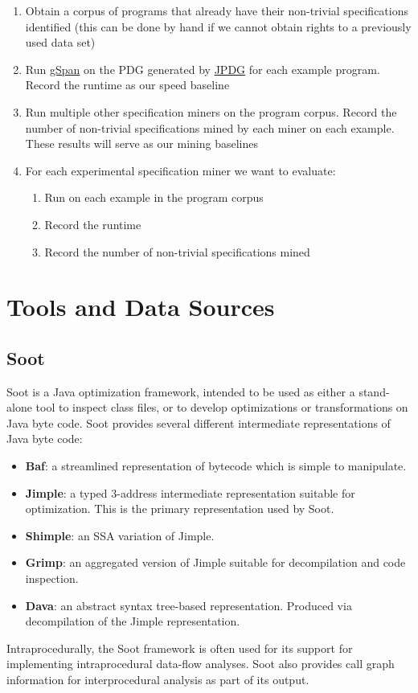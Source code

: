\documentclass[12pt]{article}
\begin{document}
\begin{enumerate}
    \item Obtain a corpus of programs that already have their non-trivial specifications identified (this can be done by hand if we cannot obtain rights to a previously used data set)
    \item Run \hyperref[subsection:gSpan]{gSpan} on the PDG generated by \hyperref[subsection:JPDG]{JPDG} for each example program. Record the runtime as our speed baseline
    \item Run multiple other specification miners on the program corpus. Record the number of non-trivial specifications mined by each miner on each example. These results will serve as our mining baselines
    \item For each experimental specification miner we want to evaluate:
    \begin{enumerate}
        \item Run on each example in the program corpus
        \item Record the runtime
        \item Record the number of non-trivial specifications mined
    \end{enumerate}
\end{enumerate}

\section{Tools and Data Sources}
\label{section:Tools and Data Sources}
\subsection{Soot}
Soot is a Java optimization framework, intended to be used as either a stand-alone tool to inspect class files, or to develop optimizations or transformations on Java byte code. Soot provides several different intermediate representations of Java byte code: \cite{lam11:_soot_java}
\begin{itemize}
    \item\textbf{Baf}: a streamlined representation of bytecode which is simple to manipulate.
    \item\textbf{Jimple}: a typed 3-address intermediate representation suitable for optimization. This is the primary representation used by Soot.
    \item\textbf{Shimple}: an SSA variation of Jimple.
    \item\textbf{Grimp}: an aggregated version of Jimple suitable for decompilation and code inspection.
    \item\textbf{Dava}: an abstract syntax tree-based representation. Produced via decompilation of the Jimple representation.
\end{itemize}
Intraprocedurally, the Soot framework is often used for its support for implementing intraprocedural data-flow analyses. Soot also provides call graph information for interprocedural analysis as part of its output. \cite{lam11:_soot_java}
\end{document}

